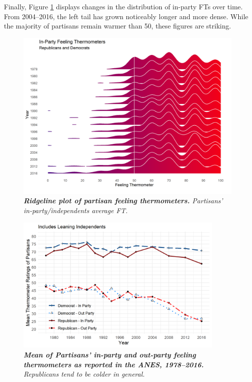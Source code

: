 \documentclass[12pt]{paper}
\begin{document}
Finally, Figure \ref{fig:ridge} displays changes in the distribution of in-party FTs over time. From 2004--2016, the left tail has grown noticeably longer and more dense. While the majority of partisans remain warmer than 50, these figures are striking.

\begin{figure}[H]
\center\includegraphics[width=5in]{cdf-ridge-ns.png}
\caption{\label{fig:ridge} \textit{\textbf{Ridgeline plot of partisan feeling thermometers.} Partisans' in-party/independents average FT.}}
\end{figure}

\begin{figure}[H]
\center\includegraphics[width=4in]{cdf-mean-ns.png}
\caption{\label{fig:cdf-mean} \textit{\textbf{Mean of Partisans' in-party and out-party feeling thermometers as reported in the ANES, 1978--2016.} Republicans tend to be colder in general.}}
\end{figure}
\end{document}
